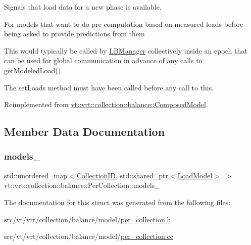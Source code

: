 Signals that load data for a new phase is available. 

For models that want to do pre-\/computation based on measured loads before being asked to provide predictions from them

This would typically be called by \hyperlink{structvt_1_1vrt_1_1collection_1_1balance_1_1_l_b_manager}{L\+B\+Manager} collectively inside an epoch that can be used for global communication in advance of any calls to \hyperlink{structvt_1_1vrt_1_1collection_1_1balance_1_1_per_collection_a465b8f14dead0affdaeb0cf24373565f}{get\+Modeled\+Load()}

The {\ttfamily set\+Loads} method must have been called before any call to this. 

Reimplemented from \hyperlink{classvt_1_1vrt_1_1collection_1_1balance_1_1_composed_model_ad8108b4392d63b7f09e443920a64933a}{vt\+::vrt\+::collection\+::balance\+::\+Composed\+Model}.



\subsection{Member Data Documentation}
\mbox{\label{structvt_1_1vrt_1_1collection_1_1balance_1_1_per_collection_aec76660b4a44fe451a9546b4f4c50d3d}} 
\subsubsection{\texorpdfstring{models\+\_\+}{models\_}}
{\footnotesize\ttfamily std\+::unordered\+\_\+map$<$\hyperlink{structvt_1_1vrt_1_1collection_1_1balance_1_1_per_collection_ade08a6857f727a0a9d1ef63b25fc5b71}{Collection\+ID}, std\+::shared\+\_\+ptr$<$\hyperlink{structvt_1_1vrt_1_1collection_1_1balance_1_1_load_model}{Load\+Model}$>$ $>$ vt\+::vrt\+::collection\+::balance\+::\+Per\+Collection\+::models\+\_\+\hspace{0.3cm}{\ttfamily [private]}}



The documentation for this struct was generated from the following files\+:\begin{DoxyCompactItemize}
\item 
src/vt/vrt/collection/balance/model/\hyperlink{per__collection_8h}{per\+\_\+collection.\+h}\item 
src/vt/vrt/collection/balance/model/\hyperlink{per__collection_8cc}{per\+\_\+collection.\+cc}\end{DoxyCompactItemize}
